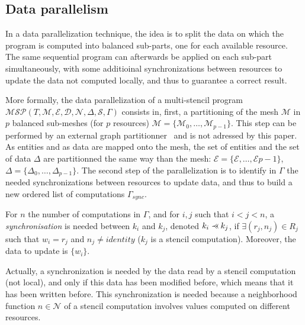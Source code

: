 
\subsection{Data parallelism}
\label{sect:dataparal}
In a data parallelization technique, the idea is to split the data on which the program is computed into balanced sub-parts, one for each available resource. The same sequential program can afterwards be applied on each sub-part simultaneously, with some additioinal synchronizations between resources to update the data not computed locally, and thus to guarantee a correct result.

More formally, the data parallelization of a multi-stencil program $\mathcal{MSP}(T,\mathcal{M},\mathcal{E},\mathcal{D},\mathcal{N},\Delta, \mathcal{S},\Gamma)$ consists in, first, a partitioning of the mesh $\mathcal{M}$ in $p$ balanced sub-meshes (for $p$ resources) $\mathcal{M}=\{\mathcal{M}_0,\dots,\mathcal{M}_{p-1}\}$. This step can be performed by an external graph partitionner~\cite{} and is not adressed by this paper. As entities and as data are mapped onto the mesh, the set of entities and the set of data $\Delta$ are partitionned the same way than the mesh: $\mathcal{E}=\{\mathcal{E},\dots,\mathcal{E}{p-1}\}$, $\Delta=\{\Delta_0,\dots,\Delta_{p-1}\}$. The second step of the parallelization is to identify in $\Gamma$ the needed synchronizations between resources to update data, and thus to build a new ordered list of computations $\Gamma_{sync}$.

\begin{mydef}
For $n$ the number of computations in $\Gamma$, and for $i,j$ such that $i<j<n$, a \textit{synchronisation} is needed between $k_i$ and $k_j$, denoted $k_i \pprec k_j$, if $\exists (r_j,n_j) \in R_j$ such that $w_i=r_j$ and $n_j\neq identity$ ($k_j$ is a stencil computation). Moreover, the data to update is $\{w_i\}$.
\end{mydef}

Actually, a synchronization is needed by the data read by a stencil computation (not local), and only if this data has been modified before, which means that it has been written before. This synchronization is needed because a neighborhood function $n \in \mathcal{N}$ of a stencil computation involves values computed on different resources.

